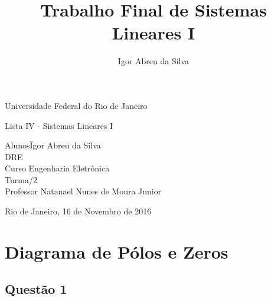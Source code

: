 \documentclass[a4paper, 12pt]{article}
\author{Igor Abreu da Silva}
\title{Trabalho Final de Sistemas Lineares I}
\begin{document}
    \begin{titlepage}
        \begin{center}
            \huge{Universidade Federal do Rio de Janeiro}
            \vspace{95pt}

            \large{Lista IV - Sistemas Lineares I}
            \vspace{160pt}
        \end{center}

        \begin{flushleft}
            \begin{tabbing}
                Alunos\qquad\qquad\= Igor Abreu da Silva\\
                DRE \\
                Curso\> Engenharia Eletrônica \\
                Turma/2 \\
                Professor\> Natanael Nunes de Moura Junior \\

            \end{tabbing}

        \end{flushleft}

        \begin{center}
            \vspace{\fill}
            Rio de Janeiro, 16 de Novembro de 2016
        \end{center}
    \end{titlepage}

    \newpage
    \tableofcontents
    \listoffigures
    \thispagestyle{empty}
    \newpage

\section{Diagrama de P\'{o}los e Zeros}
    \subsection{Quest\~{a}o 1}
\end{document}
